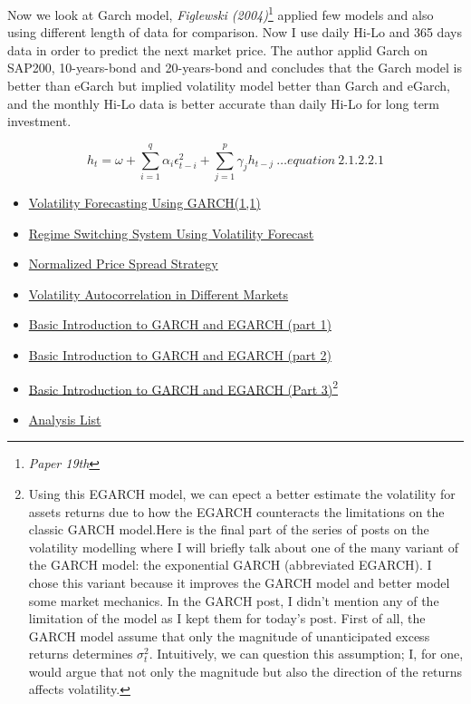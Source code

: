 \documentclass[]{tufte-book}
\begin{document}
Now we look at Garch model, \emph{Figlewski (2004)}\footnote{\emph{Paper
  19th}} applied few models and also using different length of data for
comparison. Now I use daily Hi-Lo and 365 days data in order to predict
the next market price. The author applid Garch on SAP200, 10-years-bond
and 20-years-bond and concludes that the Garch model is better than
eGarch but implied volatility model better than Garch and eGarch, and
the monthly Hi-Lo data is better accurate than daily Hi-Lo for long term
investment.

\[h_{t} = {\omega} + \sum_{i=1}^q{{\alpha}_{i} {\epsilon}_{t-i}^2} + \sum_{j=1}^p{{\gamma}_{j} h_{t-j}}\ \dots equation\ 2.1.2.2.1\]

\begin{itemize}
\item
  \href{https://quantumfinancier.wordpress.com/2010/08/26/volatility-forecasting-using-garch11/}{{Volatility
  Forecasting Using GARCH(1,1)}}
\item
  \href{https://quantumfinancier.wordpress.com/2010/08/27/regime-switching-system-using-volatility-forecast/}{{Regime
  Switching System Using Volatility Forecast}}
\item
  \href{https://quantumfinancier.wordpress.com/2010/06/17/normalized-price-spread-strategy/}{{Normalized
  Price Spread Strategy}}
\item
  \href{https://quantumfinancier.wordpress.com/2010/05/27/volatility-autocorrelation-in-different-markets/}{{Volatility
  Autocorrelation in Different Markets}}
\item
  \href{https://quantumfinancier.wordpress.com/2010/09/12/381/}{{Basic
  Introduction to GARCH and EGARCH (part 1)}}
\item
  \href{https://quantumfinancier.wordpress.com/2010/09/14/basic-introduction-to-garch-and-egarch-part-2/}{{Basic
  Introduction to GARCH and EGARCH (part 2)}}
\item
  \href{http://quantumfinancier.wordpress.com/2010/09/23/basic-introduction-to-garch-and-egarch-part-3/amp}{{Basic
  Introduction to GARCH and EGARCH (Part 3)}}\footnote{Using this EGARCH
    model, we can epect a better estimate the volatility for assets
    returns due to how the EGARCH counteracts the limitations on the
    classic GARCH model.Here is the final part of the series of posts on
    the volatility modelling where I will briefly talk about one of the
    many variant of the GARCH model: the exponential GARCH (abbreviated
    EGARCH). I chose this variant because it improves the GARCH model
    and better model some market mechanics. In the GARCH post, I didn't
    mention any of the limitation of the model as I kept them for
    today's post. First of all, the GARCH model assume that only the
    magnitude of unanticipated excess returns determines \(\sigma^2_t\).
    Intuitively, we can question this assumption; I, for one, would
    argue that not only the magnitude but also the direction of the
    returns affects volatility.}
\item
  \href{https://vlab.stern.nyu.edu/doc?topic=mdls}{{Analysis List}}


\end{itemize}
\end{document}
